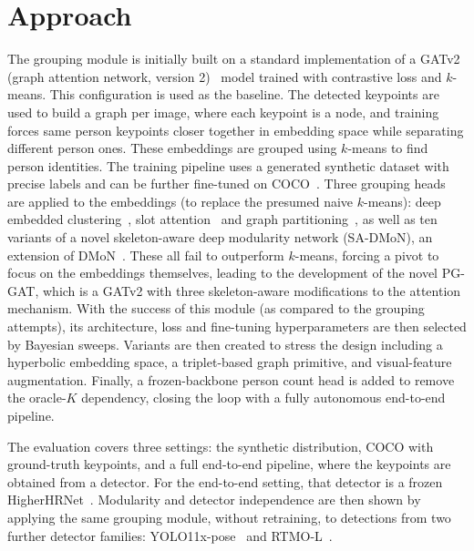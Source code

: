 \section{Approach}
\label{sec_intro_approach}

The grouping module is initially built on a standard implementation of a GATv2 (graph attention network, version 2)~\cite{brody2022gatv2} model trained
with contrastive loss and $k$-means. This configuration is used as the baseline. The detected keypoints are used to 
build a graph per image,
where each keypoint is a node, and training forces same person keypoints closer together
in embedding space while separating different person ones. These embeddings are grouped using $k$-means 
to find person identities. The training pipeline uses a generated synthetic dataset 
with precise labels and can be further fine-tuned on COCO~\cite{lin2014coco}.
Three grouping heads are applied to the embeddings (to replace the presumed naive $k$-means): 
deep embedded clustering~\cite{xie2016dec}, slot attention~\cite{locatello2020slotattention}
and graph partitioning~\cite{yang2020gcnve}, as well as 
ten variants of a novel skeleton-aware deep modularity network (SA-DMoN), an extension of
DMoN~\cite{tsitsulin2023dmon}. These all fail to outperform $k$-means, forcing a pivot
to focus on the embeddings themselves, leading to the development of the novel PG-GAT,
which is a GATv2 with three skeleton-aware modifications to the attention mechanism. With the success  
of this module (as compared to the grouping attempts), its architecture, loss and fine-tuning hyperparameters 
are then selected by Bayesian sweeps. Variants are then created to stress the design including a hyperbolic
embedding space, a triplet-based graph primitive, and visual-feature augmentation. Finally, 
a frozen-backbone person count head is added to remove the oracle-$K$ dependency, closing the 
loop with a fully autonomous end-to-end pipeline.

The evaluation covers three settings: the synthetic distribution, COCO with ground-truth
keypoints, and a full end-to-end pipeline, where the keypoints are obtained from a detector.
For the end-to-end setting, that detector is a frozen HigherHRNet~\cite{cheng2020higherhrnet}.
Modularity and detector independence are then shown by applying the same grouping module,
without retraining, to detections from two further detector families:
YOLO11x-pose~\cite{ultralytics2024yolo11} and RTMO-L~\cite{lu2024rtmo}.